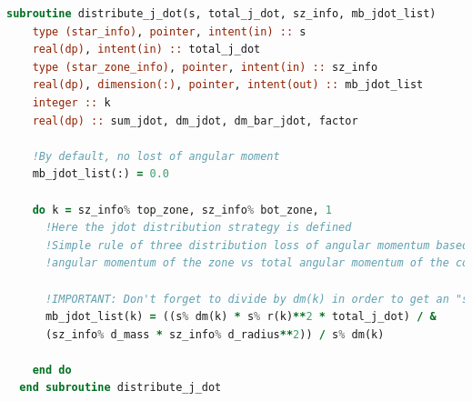\begin{lstlisting}[language=Fortran, caption={Rutina de distribución de pérdida de momento angular.}, label={lst:dis_jdot}]
  subroutine distribute_j_dot(s, total_j_dot, sz_info, mb_jdot_list)
	type (star_info), pointer, intent(in) :: s
	real(dp), intent(in) :: total_j_dot
	type (star_zone_info), pointer, intent(in) :: sz_info
	real(dp), dimension(:), pointer, intent(out) :: mb_jdot_list
	integer :: k
	real(dp) :: sum_jdot, dm_jdot, dm_bar_jdot, factor
	
	!By default, no lost of angular moment
	mb_jdot_list(:) = 0.0
	
	do k = sz_info% top_zone, sz_info% bot_zone, 1
	  !Here the jdot distribution strategy is defined
	  !Simple rule of three distribution loss of angular momentum based on the 
	  !angular momentum of the zone vs total angular momentum of the convective zone
	
	  !IMPORTANT: Don't forget to divide by dm(k) in order to get an "specific" jdot
	  mb_jdot_list(k) = ((s% dm(k) * s% r(k)**2 * total_j_dot) / &
	  (sz_info% d_mass * sz_info% d_radius**2)) / s% dm(k)
	
	end do
  end subroutine distribute_j_dot
	
\end{lstlisting}





\endinput
